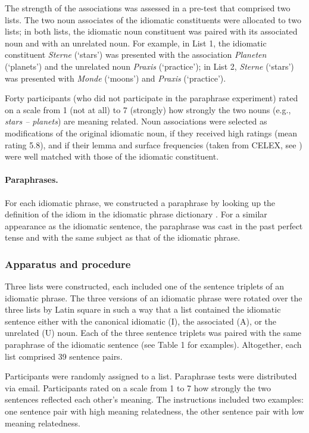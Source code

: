 The strength of the associations was assessed in a pre-test that comprised two lists. The two noun associates of the idiomatic constituents were allocated to two lists; in both lists, the idiomatic noun constituent was paired with its associated noun and with an unrelated noun.  For example, in List 1, the idiomatic constituent \textit{Sterne} (‘stars’) was presented with the association \textit{Planeten} (‘planets’) and the unrelated noun \textit{Praxis} (‘practice’); in List 2, \textit{Sterne} (‘stars’) was presented with \textit{Monde} (‘moons’) and \textit{Praxis} (‘practice’).

Forty participants (who did not participate in the paraphrase experiment) rated on a scale from 1 (not at all) to 7 (strongly) how strongly the two nouns (e.g., \textit{stars – planets}) are meaning related. Noun associations were selected as modifications of the original idiomatic noun, if they received high ratings (mean rating 5.8), and if their lemma and surface frequencies (taken from CELEX, see \citealt{baayen:1993}) were well matched with those of the idiomatic constituent. 

\paragraph{Paraphrases.} 
For each idiomatic phrase, we constructed a paraphrase by looking up the definition of the idiom in the idiomatic phrase dictionary \citep{redewendungen:2002}. For a similar appearance as the idiomatic sentence, the paraphrase was cast in the past perfect tense and with the same subject as that of the idiomatic phrase. 

\subsubsection{Apparatus and procedure}
Three lists were constructed, each included one of the sentence triplets of an idiomatic phrase.  The three versions of an idiomatic phrase were rotated over the three lists by Latin square in such a way that a list contained the idiomatic sentence either with the canonical idiomatic (I), the associated (A), or the unrelated (U) noun. Each of the three sentence triplets was paired with the same paraphrase of the idiomatic sentence (see Table 1 for examples). Altogether, each list comprised 39 sentence pairs. 

Participants were randomly assigned to a list. Paraphrase tests were distributed via email. Participants rated on a scale from 1 to 7 how strongly the two sentences reflected each other’s meaning. The instructions included two examples: one sentence pair with high meaning relatedness, the other sentence pair with low meaning relatedness. 

